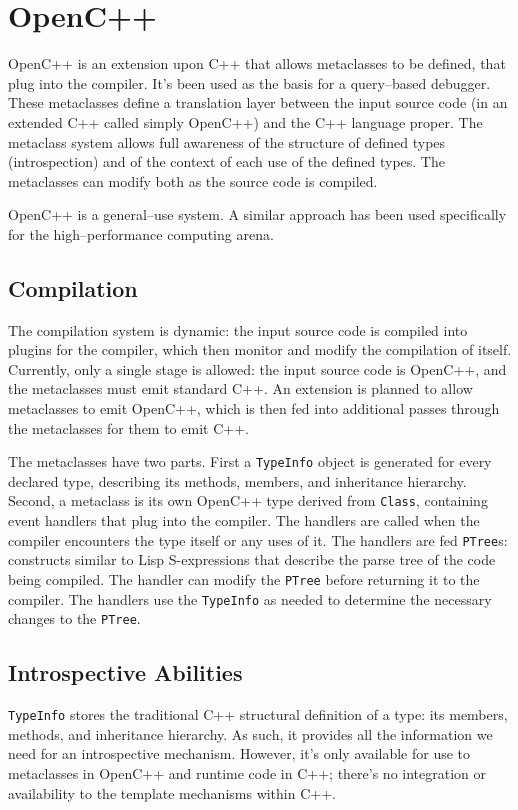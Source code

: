 \section{OpenC++}
	OpenC++\cite{chiba, opencpp, opencpp-tut} is an extension upon C++ that allows metaclasses to be defined, that plug into the compiler.  It's been used as the basis for a query--based debugger\cite{263752, 381750}.  These metaclasses define a translation layer between the input source code (in an extended C++ called simply OpenC++) and the C++ language proper.  The metaclass system allows full awareness of the structure of defined types (introspection) and of the context of each use of the defined types.  The metaclasses can modify both as the source code is compiled.

	OpenC++ is a general--use system.  A similar approach\cite{240738} has been used specifically for the high--performance computing arena.

	\subsection{Compilation}
	The compilation system is dynamic: the input source code is compiled into plugins for the compiler, which then monitor and modify the compilation of itself.  Currently, only a single stage is allowed: the input source code is OpenC++, and the metaclasses must emit standard C++.  An extension is planned to allow metaclasses to emit OpenC++, which is then fed into additional passes through the metaclasses for them to emit C++.

	The metaclasses have two parts.  First a \texttt{TypeInfo} object is generated for every declared type, describing its methods, members, and inheritance hierarchy.  Second, a metaclass is its own OpenC++ type derived from \texttt{Class}, containing event handlers that plug into the compiler.  The handlers are called when the compiler encounters the type itself or any uses of it.  The handlers are fed \texttt{PTree}s: constructs similar to Lisp S-expressions that describe the parse tree of the code being compiled.  The handler can modify the \texttt{PTree} before returning it to the compiler.  The handlers use the \texttt{TypeInfo} as needed to determine the necessary changes to the \texttt{PTree}.

	\subsection{Introspective Abilities}
	\texttt{TypeInfo} stores the traditional C++ structural definition of a type: its members, methods, and inheritance hierarchy.  As such, it provides all the information we need for an introspective mechanism.  However, it's only available for use to metaclasses in OpenC++ and runtime code in C++; there's no integration or availability to the template mechanisms within C++.
	
